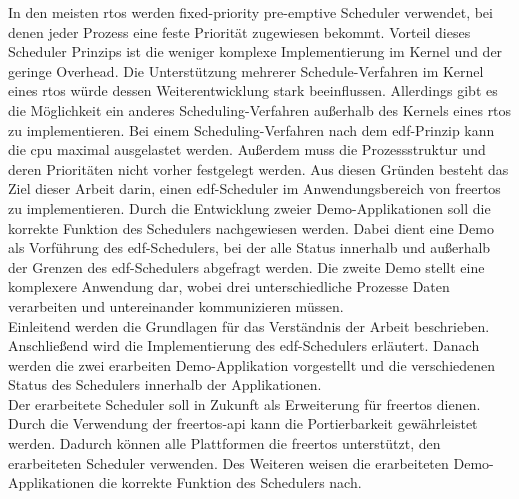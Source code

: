 \documentclass[../EDF Master Thesis.tex]{subfiles}
\begin{document}
    In den meisten \ac{rtos} werden fixed-priority pre-emptive Scheduler verwendet, bei denen jeder Prozess eine feste Priorität zugewiesen bekommt.
    Vorteil dieses Scheduler Prinzips ist die weniger komplexe Implementierung im Kernel und der geringe Overhead.
    Die Unterstützung mehrerer Schedule-Verfahren im Kernel eines \ac{rtos} würde dessen Weiterentwicklung stark beeinflussen.
    Allerdings gibt es die Möglichkeit ein anderes Scheduling-Verfahren außerhalb des Kernels eines \ac{rtos} zu implementieren.
    Bei einem Scheduling-Verfahren nach dem \ac{edf}-Prinzip kann die \ac{cpu} maximal ausgelastet werden.
    Außerdem muss die Prozessstruktur und deren Prioritäten nicht vorher festgelegt werden.
    Aus diesen Gründen besteht das Ziel dieser Arbeit darin, einen \ac{edf}-Scheduler im Anwendungsbereich von \ac{freertos} zu implementieren.
    Durch die Entwicklung zweier Demo-Applikationen soll die korrekte Funktion des Schedulers nachgewiesen werden.
    Dabei dient eine Demo als Vorführung des \ac{edf}-Schedulers, bei der alle Status innerhalb und außerhalb der Grenzen des \ac{edf}-Schedulers abgefragt werden.
    Die zweite Demo stellt eine komplexere Anwendung dar, wobei drei unterschiedliche Prozesse Daten verarbeiten und untereinander kommunizieren müssen.\\
    Einleitend werden die Grundlagen für das Verständnis der Arbeit beschrieben.
    Anschließend wird die Implementierung des \ac{edf}-Schedulers erläutert.
    Danach werden die zwei erarbeiten Demo-Applikation vorgestellt und die verschiedenen Status des Schedulers innerhalb der Applikationen.\\
    Der erarbeitete Scheduler soll in Zukunft als Erweiterung für \ac{freertos} dienen.
    Durch die Verwendung der \ac{freertos}-\ac{api} kann die Portierbarkeit gewährleistet werden.
    Dadurch können alle Plattformen die \ac{freertos} unterstützt, den erarbeiteten Scheduler verwenden.
    Des Weiteren weisen die erarbeiteten Demo-Applikationen die korrekte Funktion des Schedulers nach.
\end{document}
